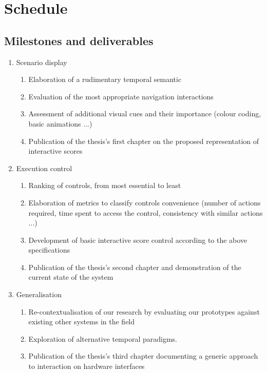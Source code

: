 \documentclass[journal,onecolumn]{IEEEtran}
\begin{document}
\section{Schedule} %
\subsection{Milestones and deliverables}
\renewcommand{\theenumi}{M.\arabic{enumi}}
\renewcommand{\theenumii}{d.\arabic{enumi}.\arabic{enumii}}
\begin{enumerate}
    \item Scenario display
    \begin{enumerate}
        \item Elaboration of a rudimentary temporal semantic
        \item Evaluation of the most appropriate navigation interactions
        \item Assessment of additional visual cues and their importance (colour coding, basic animations ...)
        \item Publication of the thesis's first chapter on the proposed representation of interactive scores
    \end{enumerate}
    \item Execution control
    \begin{enumerate}
        \item Ranking of controls, from most essential to least
        \item Elaboration of metrics to classify controls convenience (number of actions required, time spent to access the control, consistency with similar actions ...)
        \item Development of basic interactive score control according to the above specifications
        \item Publication of the thesis's second chapter and demonstration of the current state of the system
    \end{enumerate}
    \item Generalisation
    \begin{enumerate}
        \item Re-contextualisation of our research by evaluating our prototypes against existing other systems in the field
        \item Exploration of alternative temporal paradigms.
        \item Publication of the thesis's third chapter documenting a generic approach to interaction on hardware interfaces

\end{enumerate}
\end{enumerate}
\end{document}
